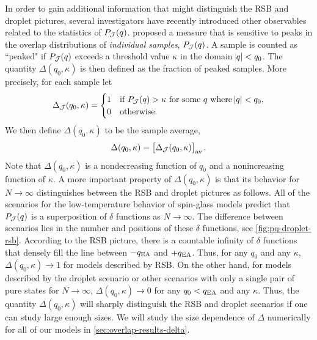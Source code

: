 In order to gain additional information that might distinguish the RSB and
droplet pictures, several investigators have recently introduced other
observables related to the statistics of $P_{\mathcal{J}}(q)$.
\textcite{yucesoy2012evidence} proposed a measure that is sensitive to peaks in
the overlap distributions of \emph{individual samples}, $P_{\mathcal{J}}(q)$. A sample
is counted as ``peaked" if $P_{\mathcal{J}}(q)$ exceeds a threshold value $\kappa$ in
the domain $\abs{q} < q_0$. The quantity $\Delta(q_0,\kappa)$ is then defined
as the fraction of peaked samples. More precisely, for each sample let
\begin{equation}
  \Delta_{\mathcal{J}}(q_0,\kappa) =
  \begin{cases}
    1 & \text{if $P_{\mathcal{J}}(q)>\kappa$ for some $q$ where $\abs{q}<q_0$}, \\
    0 & \text{otherwise.}
  \end{cases}
  \label{eq:delta-sample}
\end{equation}
We then define $\Delta(q_0,\kappa)$ to be the sample average,
\begin{equation}
  \Delta(q_0,\kappa) = \left[\Delta_{\mathcal{J}}(q_0,\kappa)\right]_{\mathrm{av}}.
  \label{eq:delta-average}
\end{equation}
Note that $\Delta(q_0,\kappa)$ is a nondecreasing function of $q_0$ and a
nonincreasing function of $\kappa$. A more important property of
$\Delta(q_0,\kappa)$ is that its behavior for $N \to \infty$ distinguishes
between the RSB and droplet pictures as follows. All of the scenarios for the
low-temperature behavior of spin-glass models predict that $P_{\mathcal{J}}(q)$ is a
superposition of $\delta$ functions as $N \to \infty$. The difference between
scenarios lies in the number and positions of these $\delta$ functions, see
\cref{fig:pq-droplet-rsb}. According to the RSB picture, there is a countable
infinity of $\delta$ functions that densely fill the line between $-q_{\mathrm{EA}}$ and
$+q_{\mathrm{EA}}$. Thus, for any $q_0$ and any $\kappa$, $\Delta(q_0,\kappa) \to 1$ for
models described by RSB. On the other hand, for models described by the droplet
scenario or other scenarios with only a single pair of pure states for $N \to
\infty$, $\Delta(q_0,\kappa) \to 0$ for any $q_0<q_{\mathrm{EA}}$ and any $\kappa$. Thus,
the quantity $\Delta(q_0,\kappa)$ will sharply distinguish the RSB and droplet
scenarios if one can study large enough sizes. We will study the size
dependence of $\Delta$ numerically for all of our models in
\cref{sec:overlap-results-delta}.
